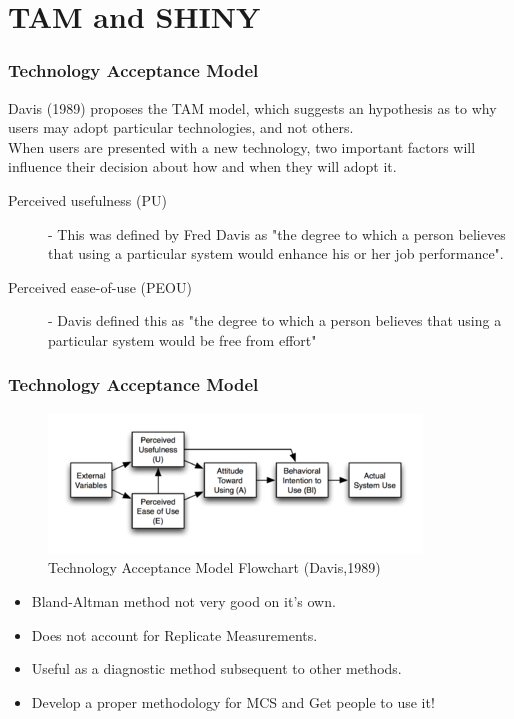 \documentclass[compress]{beamer}        %
\begin{document}
\section{TAM and SHINY}
\begin{frame}
		\frametitle{Technology Acceptance Model}
	\vspace{-0.4cm}
Davis (1989) proposes the TAM model, which suggests an hypothesis as to why users may adopt particular technologies, and not others. \\ \bigskip
When users are presented with a new 
technology, two important factors will influence their decision about how and when they will adopt it.
\begin{description}
	\item[Perceived usefulness (PU)] - This was defined by Fred Davis as "the degree to which a person believes that using a particular system would enhance his or her job performance".
	\item[Perceived ease-of-use (PEOU)] - Davis defined this as "the degree to which a person believes that using a particular system would be free from effort" 
\end{description}
\end{frame}

\begin{frame}
	\frametitle{Technology Acceptance Model}

\begin{figure}
\centering
\includegraphics[width=0.89\linewidth]{TechAccept}
\caption{Technology Acceptance Model Flowchart (Davis,1989)}
\label{fig:TechAccept}
\end{figure}

\end{frame}

\begin{frame}
	\Large
	\begin{itemize}
		\item Bland-Altman method not very good on it's own.
		\item Does not account for Replicate Measurements.
		\item Useful as a diagnostic method subsequent to other methods.
		\item Develop a proper methodology for MCS and Get people to use it!
	\end{itemize}
\end{frame}
\end{document}
